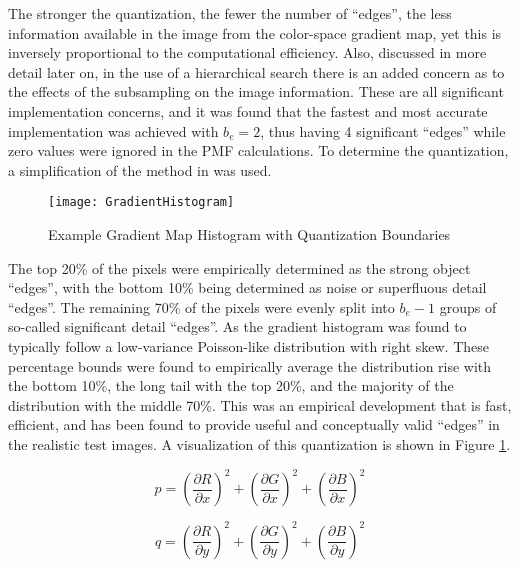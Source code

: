The stronger the quantization, \ie{ }the fewer the number of ``edges'', the less information available in the image from the color-space gradient map, yet this is inversely proportional to the computational efficiency. Also, discussed in more detail later on, in the use of a hierarchical search there is an added concern as to the effects of the subsampling on the image information. These are all significant implementation concerns, and it was found that the fastest and most accurate implementation was achieved with $b_{e}=2$, thus having 4 significant ``edges'' while zero values were ignored in the PMF calculations. To determine the quantization, a simplification of the method in \cite{Ugarriza2009} was used.

\begin{figure}[h]
\centering
\texttt{[image: GradientHistogram]}
\caption{Example Gradient Map Histogram with Quantization Boundaries}
\label{gradienthistogram}
\end{figure}

The top 20\% of the pixels were empirically determined as the strong object ``edges'', with the bottom 10\% being determined as noise or superfluous detail ``edges''. The remaining 70\% of the pixels were evenly split into $b_{e}-1$ groups of so-called significant detail ``edges''. As the gradient histogram was found to typically follow a low-variance Poisson-like distribution with right skew. These percentage bounds were found to empirically average the distribution rise with the bottom 10\%, the long tail with the top 20\%, and the majority of the distribution with the middle 70\%. This was an empirical development that is fast, efficient, and has been found to provide useful and conceptually valid ``edges'' in the realistic test images. A visualization of this quantization is shown in Figure \ref{gradienthistogram}.

\begin{equation}
p = \left( \frac{\partial R}{\partial x} \right)^{2} +
	\left( \frac{\partial G}{\partial x} \right)^{2} +
	\left( \frac{\partial B}{\partial x} \right)^{2}
\label{ColorGradientP}
\end{equation}

\begin{equation}
q = \left( \frac{\partial R}{\partial y} \right)^{2} +
	\left( \frac{\partial G}{\partial y} \right)^{2} +
	\left( \frac{\partial B}{\partial y} \right)^{2}
\label{ColorGradientQ}
\end{equation}

